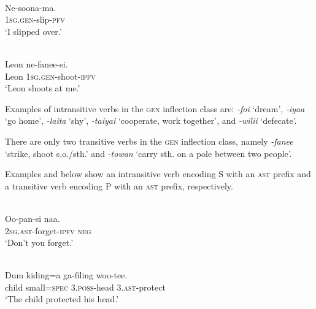 \ea%
\label{bkm:Ref353451839}
 \\ 
\gll     Ne-soona-ma.  \\  
    1\textsc{sg.gen}{}-slip-\textsc{pfv}   \\
\glt  `I slipped over.'
\z








\ea%
\label{bkm:Ref324339697}
 \\ 
\gll     Leon  ne-fanee-si.\\  
  Leon  1\textsc{sg}.\textsc{gen}{}-shoot-\textsc{ipfv}   \\
\glt  `Leon shoots at me.'
\z



 



Examples of intransitive verbs in the \textsc{gen} inflection class are: \textit{-foi} `dream', \textit{-iyaa} `go home', \textit{-laita} `shy', \textit{-taiyai} `cooperate, work together', and \textit{-wilii} `defecate'.

There are only two transitive verbs in the \textsc{gen} inflection class, namely \textit{-fanee} `strike, shoot s.o./sth.' and \textit{-towan} `carry sth. on a pole between two people'.

Examples  and  below show an intransitive verb encoding S with an \textsc{ast} prefix and a transitive verb encoding P with an \textsc{ast} prefix, respectively.


\ea%
\label{bkm:Ref324340307}
 \\ 
\gll     Oo-pan-si  naa.\\  
    2\textsc{sg.ast}{}-forget-\textsc{ipfv} \textsc{neg}  \\
\glt  `Don't you forget.'
\z








\ea%
\label{bkm:Ref324340314}
 \\ 
\gll   Dum  kiding=a  ga-filing  woo-tee. \\  
  child  small=\textsc{spec} \textsc{3.poss}{}-head  3.\textsc{ast}{}-protect   \\
\glt  `The child protected his head.'
\z



